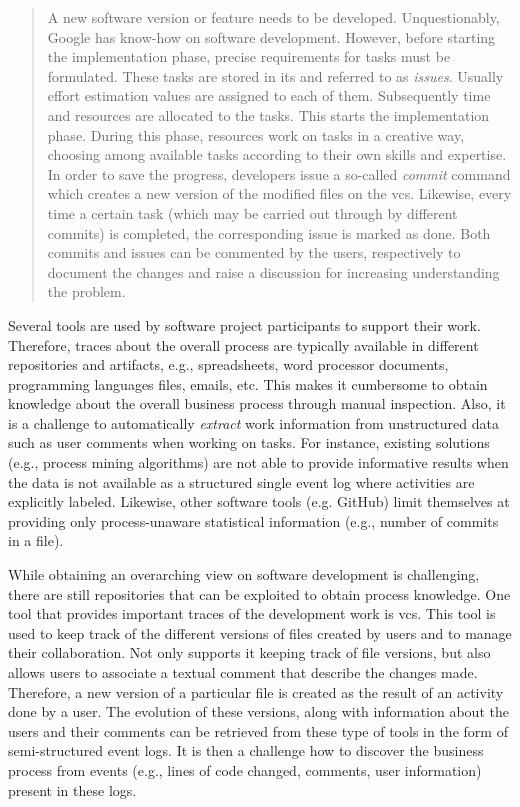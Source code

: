 \begin{quote}
	A new software version or feature needs to be developed. Unquestionably, Google has know-how on software development. However, before starting the implementation phase, precise requirements for tasks must be formulated. These tasks are stored in \gls{its} and referred to as \emph{issues}. Usually effort estimation values are assigned to each of them. Subsequently time and resources are allocated to the tasks. This starts the implementation phase. During this phase, resources work on tasks in a creative way, choosing among available tasks according to their own skills and expertise. In order to save the progress, developers issue a so-called \emph{commit} command which creates a new version of the modified files on the \gls{vcs}. Likewise, every time a certain task (which may be carried out through by different commits) is completed, the corresponding issue is marked as done. Both commits and issues can be commented by the users, respectively to document the changes and raise a discussion for increasing understanding the problem.
\end{quote}

Several tools are used by software project participants to support their work. Therefore, traces about the overall process are typically available in different repositories and artifacts, e.g., spreadsheets, word processor documents, programming languages files, emails, etc. This makes it cumbersome to obtain knowledge about the overall business process through manual inspection. Also, it is a challenge to automatically \emph{extract} work information from unstructured data such as user comments when working on tasks. For instance, existing solutions (e.g., process mining algorithms) are not able to provide informative results when the data is not available as a structured single event log where activities are explicitly labeled. Likewise, other software tools (e.g. GitHub) limit themselves at providing only process-unaware statistical information (e.g., number of commits in a file).



While obtaining an overarching view on software development is challenging, there are still repositories that can be exploited to obtain process knowledge. One tool that provides important traces of the development work is \gls{vcs}. This tool is used to keep track of the different versions of files created by users and to manage their collaboration. Not only supports it keeping track of file versions, but also allows users to associate a textual comment that describe the changes made. Therefore, a new version of a particular file is created as the result of an activity done by a user. The evolution of these versions, along with information about the users and their comments can be retrieved from these type of tools in the form of semi-structured event logs. It is then a challenge how to discover the business process from events (e.g., lines of code changed, comments, user information) present in these logs.


